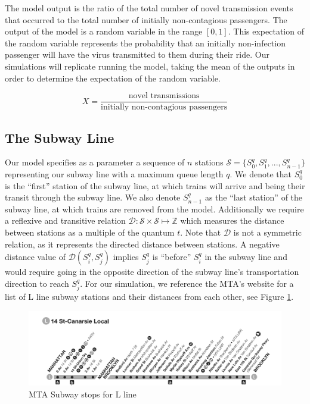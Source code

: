 \documentclass[12pt]{article}
\begin{document}
The model output is the ratio of the total number of novel transmission events that occurred to the total number of initially non-contagious passengers.
The output of the model is a random variable in the range $[0, 1]$.
This expectation of the random variable represents the probability that an initially non-infection passenger will have the virus transmitted to them during their ride.
Our simulations will replicate running the model, taking the mean of the outputs in order to determine the expectation of the random variable.

$$ X = \frac{\text{novel transmissions}}{\text{initially non-contagious passengers}} $$

\subsection{The Subway Line}

Our model specifies as a parameter a sequence of $n$ stations $\mathcal{S} = \{ S_0^q, S_1^q, ... , S_{n-1}^q \}$ representing our subway line with a maximum queue length $q$.
We denote that $S_0^q$ is the ``first'' station of the subway line, at which trains will arrive and being their transit through the subway line. We also denote $S_{n-1}^q$ as the ``last station'' of the subway line, at which trains are removed from the model.
Additionally we require a reflexive and transitive relation $\mathcal{D} : \mathcal{S} \times \mathcal{S} \mapsto \mathbb{Z}$ which measures the distance between stations as a multiple of the quantum $t$.
Note that $\mathcal{D}$ is not a symmetric relation, as it represents the directed distance between stations.
A negative distance value of $\mathcal{D}(S_i^q,S_j^q)$ implies $S_j^q$ is ``before'' $S_i^q$ in the subway line and would require going in the opposite direction of the subway line's transportation direction to reach $ S_j^q$.
For our simulation, we reference the MTA's website for a list of L line subway stations and their distances from each other, see Figure \ref{L-line-map}.

\begin{figure}[h]
	\centering
	\includegraphics[scale=.80]{./figures/route-l-map.png}
	\caption{MTA Subway stops for L line}
	\label{L-line-map}
\end{figure}
\end{document}
